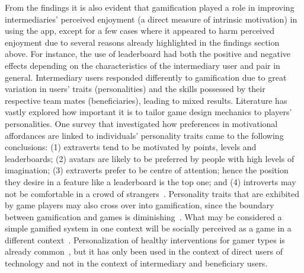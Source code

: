 From the findings it is also evident that gamification played a role in improving intermediaries' perceived enjoyment (a direct measure of intrinsic motivation) in using the app, except for a few cases where it appeared to harm  perceived enjoyment due to several reasons already highlighted in the findings section above. For instance, the use of leaderboard had both the positive and negative effects depending on the characteristics of the intermediary user and pair in general. Intermediary users responded differently to gamification due to great variation in users' traits (personalities) and the skills possessed by their respective team mates (beneficiaries), leading to mixed results. Literature has vastly explored how important it is to tailor game design mechanics to players' personalities. One survey that investigated how preferences in motivational affordances are linked to individuals' personality traits came to the following conclusions: (1) extraverts tend to be motivated by points, levels and leaderboards; (2) avatars are likely to be preferred by people with high levels of imagination; (3) extraverts prefer to be centre of attention; hence the position they desire in a feature like a leaderboard is the top one; and (4) introverts may not be comfortable in a crowd of strangers~\citep{jia2016personality}. Personality traits that are exhibited by game players may also cross over into gamification, since the boundary between gamification and games is diminishing~\citep{ferro2013towards}. What may be considered a simple gamified system in one context will be socially perceived as a game in a different context~\citep{deterding2011game}. Personalization of healthy interventions for gamer types  is already common~\citep{arteaga2010:persuasive,orji2013:tailoring}, but it has only been used in the context of direct users of technology and not in the context of intermediary and beneficiary users.

